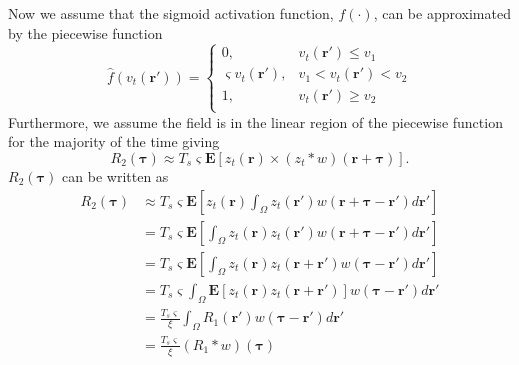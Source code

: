 \documentclass[]{article}
\begin{document}
Now we assume that the sigmoid activation function, $f(\cdot)$, can be approximated by the piecewise function
\begin{equation}
	\hat{f}(v_t(\mathbf{r}')) = \left\{ \begin{array}{ll}
		0, & v_t(\mathbf{r}') \le v_1 \\
		\varsigma v_t(\mathbf{r}'), &  v_1 < v_t(\mathbf{r}') < v_2 \\
		1, & v_t(\mathbf{r}') \ge v_2 \\ 
		\end{array}\right.
\end{equation}
Furthermore, we assume the field is in the linear region of the piecewise function for the majority of the time giving
\begin{equation}
	R_2(\boldsymbol{\tau}) \approx T_s \varsigma \mathbf{E}\left[ z_{t}\left(\mathbf{r}\right)\times \left(z_{t} \ast w\right)\left(\mathbf{r}+\boldsymbol{\tau}\right)\right].
\end{equation}
$R_2(\boldsymbol{\tau})$ can be written as
\begin{align}
	R_2(\boldsymbol{\tau}) &\approx T_s \varsigma \mathbf{E}\left[ z_{t}\left(\mathbf{r}\right)  \int_{\Omega}z_{t}\left(\mathbf{r'}\right) w\left(\mathbf{r}+\boldsymbol{\tau}-\mathbf{r'}\right) d\mathbf{r'} \right] \\
	&= T_s \varsigma \mathbf{E}\left[  \int_{\Omega}z_{t}\left(\mathbf{r}\right)z_{t}\left(\mathbf{r'}\right) w\left(\mathbf{r}+\boldsymbol{\tau}-\mathbf{r'}\right) d\mathbf{r'} \right] \\
	&= T_s \varsigma \mathbf{E}\left[  \int_{\Omega}z_{t}\left(\mathbf{r}\right)z_{t}\left(\mathbf{r}+\mathbf{r'}\right) w\left(\boldsymbol{\tau}-\mathbf{r'}\right) d\mathbf{r'} \right] \\
	&= T_s \varsigma   \int_{\Omega}\mathbf{E}\left[z_{t}\left(\mathbf{r}\right)z_{t}\left(\mathbf{r}+\mathbf{r'}\right) \right] w\left(\boldsymbol{\tau}-\mathbf{r}'\right) d\mathbf{r'}  \\
	&= \frac{T_s \varsigma}{\xi} \int_{\Omega} R_1(\mathbf{r'}) w\left(\boldsymbol{\tau}-\mathbf{r}'\right) d\mathbf{r'}  \\
	&= \frac{T_s \varsigma}{\xi} \left(R_1 \ast w\right)\left(\boldsymbol{\tau}\right)\\
\end{align}
\end{document}
